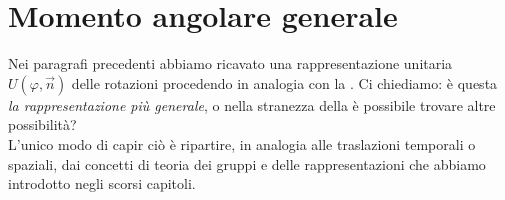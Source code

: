 \documentclass[../../FisicaTeorica.tex]{subfiles}
\begin{document}
\begin{comment}
Nella scorsa lezione abbiamo osservato la rappresentazione unitaria delle rotazioni in $\hs=L^2(\bb{R}^3,d^3x)$:
\begin{align*}
(U(\varphi, \vec{n})\psi(\vec{x})&=\psi(R^{-1}(\varphi,\vec{n}),\vec{x}); \quad U(\varphi,\vec{n})=\exp\left(i\frac{\varphi}{\hbar}\vec{L}\cdot \vec{n}\right)\\
U(2\pi,\vec{n})=\bb{I}&\Rightarrow \sigma(\vec{L}\cdot \vec{n})\subseteq \hbar \bb{Z}
\end{align*}
è questa la rappresentazione più generale delle rotazioni in \MQ? Vediamo ora che \textbf{non} è così.\\
\end{comment}
\section{Momento angolare generale}
Nei paragrafi precedenti abbiamo ricavato una rappresentazione unitaria $U(\varphi, \vec{n})$ delle rotazioni procedendo in analogia con la \MC. Ci chiediamo: è questa \textit{la rappresentazione più generale}, o nella stranezza della \MQ è possibile trovare altre possibilità?\\

L'unico modo di capir ciò è ripartire, in analogia alle traslazioni temporali o spaziali, dai concetti di teoria dei gruppi e delle rappresentazioni che abbiamo introdotto negli scorsi capitoli.\\
\end{document}
